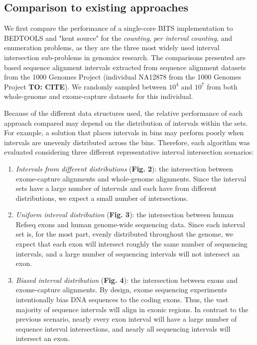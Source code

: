 \documentclass{bioinfo}
\begin{document}
	\subsection{Comparison to existing approaches}
	We first compare the performance of a single-core BITS implementation to BEDTOOLS and 
	"kent source" for the \emph{counting}, \emph{per interval counting}, and
	enumeration problems, as they are the three most widely used interval intersection
	sub-problems in genomics research. The comparisons presented are based sequence alignment
	intervals extracted from sequence alignment datasets from the 1000 Genomes Project (individual NA12878 from the 1000 
	Genomes Project \textbf{TO: CITE}).  We randomly sampled between $10^4$ and $10^7$ from both whole-genome and 
	exome-capture datasets for this individual.
	
	Because of the different data structures used, the relative performance of each 
	approach compared may depend on the distribution of
	intervals within the sets.  For example, a solution that places intervals in
	bins may perform poorly when intervals are unevenly distributed across the bins.
	Therefore, each algorithm was evaluated considering three different
	representative interval intersection scenarios:

		\begin{enumerate}
			\item
			{\em Intervals from different distributions} (\textbf{Fig. 2}): the intersection between exome-capture 
			alignments and whole-genome alignments. Since the interval sets have a large number of intervals
			and each have from different distributions, we expect a small number of intersections.
			
			\item
			{\em Uniform interval distribution} (\textbf{Fig. 3}): the intersection between human
			Refseq exons and human genome-wide sequencing data.  Since each interval set
			is, for the most part, evenly distributed throughout the genome, we expect 
			that each exon will intersect roughly the same number of sequencing intervals, 
			and a large number of sequencing intervals will not intersect an exon.

			\item
			{\em Biased interval distribution} (\textbf{Fig. 4}):  the intersection between exons and exome-capture
			alignments.  By design, exome sequencing experiments intentionally bias DNA sequences to the coding exons.  
			Thus, the vast majority of sequence intervals will align in exonic regions. In contrast to the previous 
			scenario, nearly every exon interval will have a large number of sequence interval intersections, and 
			nearly all sequencing intervals will intersect an exon.
		\end{enumerate}
\end{document}
